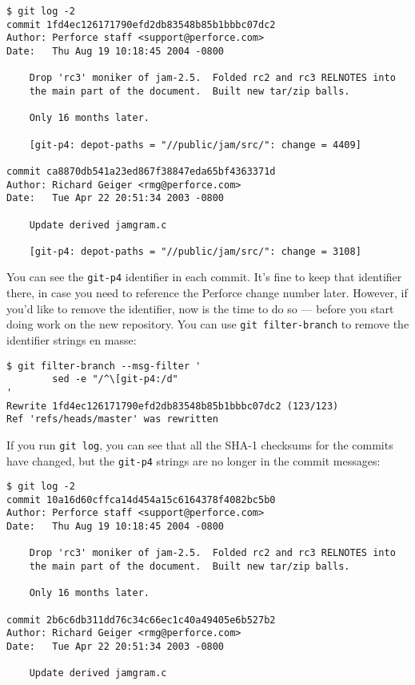 \documentclass[a4paper]{book}
\begin{document}
\begin{shaded}\begin{verbatim}
$ git log -2
commit 1fd4ec126171790efd2db83548b85b1bbbc07dc2
Author: Perforce staff <support@perforce.com>
Date:   Thu Aug 19 10:18:45 2004 -0800

    Drop 'rc3' moniker of jam-2.5.  Folded rc2 and rc3 RELNOTES into
    the main part of the document.  Built new tar/zip balls.

    Only 16 months later.

    [git-p4: depot-paths = "//public/jam/src/": change = 4409]

commit ca8870db541a23ed867f38847eda65bf4363371d
Author: Richard Geiger <rmg@perforce.com>
Date:   Tue Apr 22 20:51:34 2003 -0800

    Update derived jamgram.c

    [git-p4: depot-paths = "//public/jam/src/": change = 3108]
\end{verbatim}\end{shaded}

You can see the \texttt{git-p4} identifier in each commit. It's fine to keep that identifier there, in case you need to reference the Perforce change number later. However, if you'd like to remove the identifier, now is the time to do so --- before you start doing work on the new repository. You can use \texttt{git filter-branch} to remove the identifier strings en masse:

\begin{shaded}\begin{verbatim}
$ git filter-branch --msg-filter '
        sed -e "/^\[git-p4:/d"
'
Rewrite 1fd4ec126171790efd2db83548b85b1bbbc07dc2 (123/123)
Ref 'refs/heads/master' was rewritten
\end{verbatim}\end{shaded}

If you run \texttt{git log}, you can see that all the SHA-1 checksums for the commits have changed, but the \texttt{git-p4} strings are no longer in the commit messages:

\begin{shaded}\begin{verbatim}
$ git log -2
commit 10a16d60cffca14d454a15c6164378f4082bc5b0
Author: Perforce staff <support@perforce.com>
Date:   Thu Aug 19 10:18:45 2004 -0800

    Drop 'rc3' moniker of jam-2.5.  Folded rc2 and rc3 RELNOTES into
    the main part of the document.  Built new tar/zip balls.

    Only 16 months later.

commit 2b6c6db311dd76c34c66ec1c40a49405e6b527b2
Author: Richard Geiger <rmg@perforce.com>
Date:   Tue Apr 22 20:51:34 2003 -0800

    Update derived jamgram.c
\end{verbatim}\end{shaded}
\end{document}
